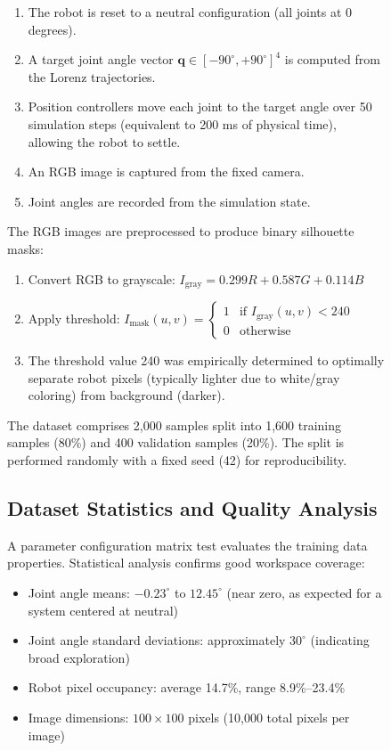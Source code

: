 \documentclass[12pt,a4paper,oneside]{report}
\begin{document}
\begin{figure}[H]
\begin{enumerate}
    \item The robot is reset to a neutral configuration (all joints at 0 degrees).
    \item A target joint angle vector $\mathbf{q} \in [-90^\circ, +90^\circ]^4$ is computed from the Lorenz trajectories.
    \item Position controllers move each joint to the target angle over 50 simulation steps (equivalent to 200 ms of physical time), allowing the robot to settle.
    \item An RGB image is captured from the fixed camera.
    \item Joint angles are recorded from the simulation state.
\end{enumerate}

The RGB images are preprocessed to produce binary silhouette masks:

\begin{enumerate}
    \item Convert RGB to grayscale: $I_{\text{gray}} = 0.299R + 0.587G + 0.114B$
    \item Apply threshold: $I_{\text{mask}}(u,v) = \begin{cases} 1 & \text{if } I_{\text{gray}}(u,v) < 240 \\ 0 & \text{otherwise} \end{cases}$
    \item The threshold value 240 was empirically determined to optimally separate robot pixels (typically lighter due to white/gray coloring) from background (darker).
\end{enumerate}

The dataset comprises 2,000 samples split into 1,600 training samples (80\%) and 400 validation samples (20\%). The split is performed randomly with a fixed seed (42) for reproducibility.

\subsection{Dataset Statistics and Quality Analysis}

A parameter configuration matrix test evaluates the training data properties. Statistical analysis confirms good workspace coverage:

\begin{itemize}
    \item Joint angle means: $-0.23^\circ$ to $12.45^\circ$ (near zero, as expected for a system centered at neutral)
    \item Joint angle standard deviations: approximately $30^\circ$ (indicating broad exploration)
    \item Robot pixel occupancy: average 14.7\%, range 8.9\%--23.4\%
    \item Image dimensions: $100 \times 100$ pixels (10,000 total pixels per image)
\end{itemize}


\end{figure}
\end{document}
